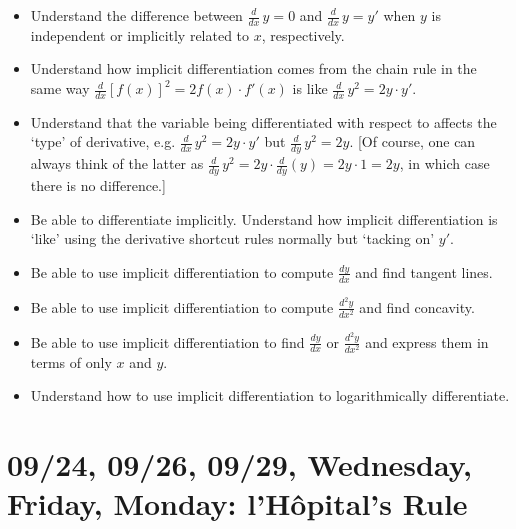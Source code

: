 \documentclass[11pt,letterpaper]{article}
\begin{document}
\begin{itemize}
\item Understand the difference between $\frac{d}{dx} \, y= 0$ and $\frac{d}{dx}\, y= y'$ when $y$ is independent or implicitly related to $x$, respectively. 
\item Understand how implicit differentiation comes from the chain rule in the same way $\frac{d}{dx} [f(x)]^2= 2f(x) \cdot f'(x)$ is like $\frac{d}{dx}\, y^2= 2y \cdot y'$.
\item Understand that the variable being differentiated with respect to affects the `type' of derivative, e.g. $\frac{d}{dx}\, y^2= 2y \cdot y'$ but $\frac{d}{dy}\, y^2= 2y$. [Of course, one can always think of the latter as $\frac{d}{dy}\, y^2= 2y \cdot \frac{d}{dy} (y)= 2y \cdot 1= 2y$, in which case there is no difference.]
\item Be able to differentiate implicitly. Understand how implicit differentiation is `like' using the derivative shortcut rules normally but `tacking on' $y'$.
\item Be able to use implicit differentiation to compute $\frac{dy}{dx}$ and find tangent lines.
\item Be able to use implicit differentiation to compute $\frac{d^2y}{dx^2}$ and find concavity.
\item Be able to use implicit differentiation to find $\frac{dy}{dx}$ or $\frac{d^2y}{dx^2}$ and express them in terms of only $x$ and $y$.
\item Understand how to use implicit differentiation to logarithmically differentiate. 
\end{itemize}

\newpage
\section*{09/24, 09/26, 09/29, Wednesday, Friday, Monday: l'H\^{o}pital's Rule\label{09-24}}
\end{document}
